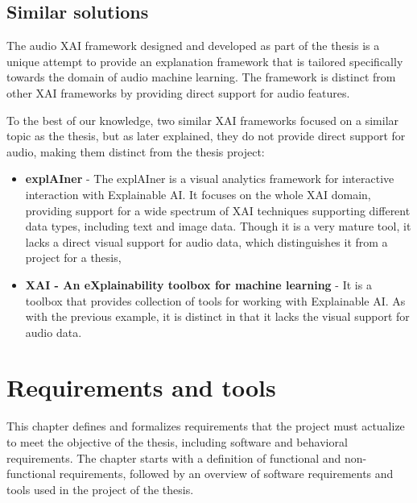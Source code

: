\documentclass[
    bindingoffset=5mm,  %
    footnoteindent=3mm, %
    hyphenation=true    %
]{src/wut-thesis}
\begin{document}
\subsection{Similar solutions}

The audio XAI framework designed and developed as part of the thesis is a unique attempt
to provide an explanation framework that is tailored specifically towards the domain of
audio machine learning. The framework is distinct from other XAI frameworks by providing
direct support for audio features.

To the best of our knowledge, two similar XAI frameworks focused on a similar topic as the thesis,
but as later explained, they do not provide direct support for audio, making them distinct from
the thesis project:
\begin{itemize}
    \item \textbf{explAIner} - The explAIner \cite{Spinner2019-jg} is a visual analytics framework
        for interactive interaction with Explainable AI. It focuses on the whole XAI domain, providing
        support for a wide spectrum of XAI techniques supporting different data types, including text and
        image data. Though it is a very mature tool, it lacks a direct visual support for audio data,
        which distinguishes it from a project for a thesis,
    \item \textbf{XAI - An eXplainability toolbox for machine learning} - It is a toolbox \cite{SomeXaiFramework}
        that provides collection of tools for working with Explainable AI. As with the previous example,
        it is distinct in that it lacks the visual support for audio data.
\end{itemize}

%
%
\clearpage %
\section{Requirements and tools} \label{ch:reqrTools}

        This chapter defines and formalizes requirements that the project must actualize
    to meet the objective of the thesis, including software and behavioral requirements.
    The chapter starts with a definition of functional and non-functional requirements,
    followed by an overview of software requirements and tools used in the project of the thesis.
\end{document}
